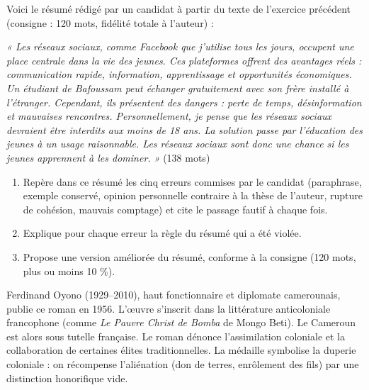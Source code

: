 \documentclass[11pt]{article}
\newcommand{\cle}[1]{{\popxbold\color{popdark}#1}}
\begin{document}
\begin{exercice}
Voici le résumé rédigé par un candidat à partir du texte de l'exercice précédent (consigne : 120 mots, fidélité totale à l'auteur) :

\emph{« Les réseaux sociaux, comme Facebook que j'utilise tous les jours, occupent une place centrale dans la vie des jeunes. Ces plateformes offrent des avantages réels : communication rapide, information, apprentissage et opportunités économiques. Un étudiant de Bafoussam peut échanger gratuitement avec son frère installé à l'étranger. Cependant, ils présentent des dangers : perte de temps, désinformation et mauvaises rencontres. Personnellement, je pense que les réseaux sociaux devraient être interdits aux moins de 18 ans. La solution passe par l'éducation des jeunes à un usage raisonnable. Les réseaux sociaux sont donc une chance si les jeunes apprennent à les dominer. »} (138 mots)

\begin{enumerate}
\item Repère dans ce résumé les cinq erreurs commises par le candidat (paraphrase, exemple conservé, opinion personnelle contraire à la thèse de l'auteur, rupture de cohésion, mauvais comptage) et cite le passage fautif à chaque fois.
\item Explique pour chaque erreur la règle du résumé qui a été violée.
\item Propose une version améliorée du résumé, conforme à la consigne (120 mots, plus ou moins 10 \%).
\end{enumerate}
\end{exercice}

\begin{savaistu}
\cle{Ferdinand Oyono} (1929--2010), haut fonctionnaire et diplomate camerounais, publie ce roman en 1956. L'œuvre s'inscrit dans la littérature anticoloniale francophone (comme \emph{Le Pauvre Christ de Bomba} de Mongo Beti). Le Cameroun est alors sous tutelle française. Le roman dénonce l'assimilation coloniale et la collaboration de certaines élites traditionnelles. La médaille symbolise la duperie coloniale : on récompense l'aliénation (don de terres, enrôlement des fils) par une distinction honorifique vide.
\end{savaistu}
\end{document}
